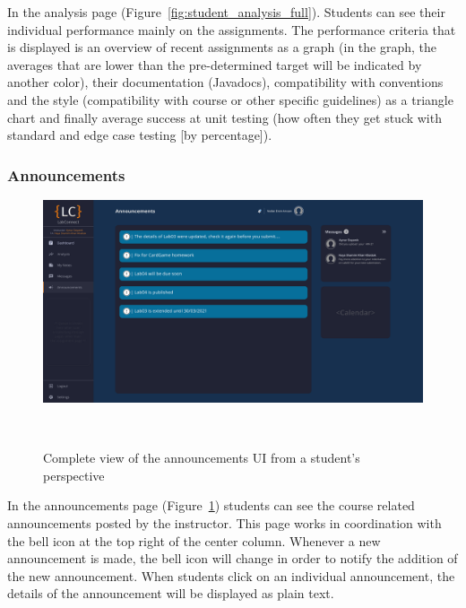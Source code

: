 \documentclass[a4paper, 12pt]{article}
\begin{document}
    In the analysis page (Figure~\ref{fig:student_analysis_full}). Students can see their individual performance mainly on the assignments.
    The performance criteria that is displayed is an overview of recent assignments as a graph (in the graph, the averages that are lower than the
    pre-determined target will be indicated by another color), their documentation (Javadocs), compatibility with conventions and the style
    (compatibility with course or other specific guidelines) as a triangle chart and finally average success at unit testing (how often they
    get stuck with standard and edge case testing [by percentage]).


    \pagebreak

    \subsubsection{Announcements}

    \begin{figure}[H]
        \centering
        \includegraphics[width=\textwidth]{student_announcements}
        \caption{Complete view of the announcements UI from a student's perspective}~\label{fig:student_announcements_full}
    \end{figure}

    In the announcements page (Figure~\ref{fig:student_announcements_full}) students can see the course related announcements posted by the instructor.
    This page works in coordination with the bell icon at the top right of the center column.
    Whenever a new announcement is made, the bell icon will change in order to notify the addition of the
    new announcement. When students click on an individual announcement, the details of the announcement will be displayed as plain text.


    \pagebreak
\end{document}

